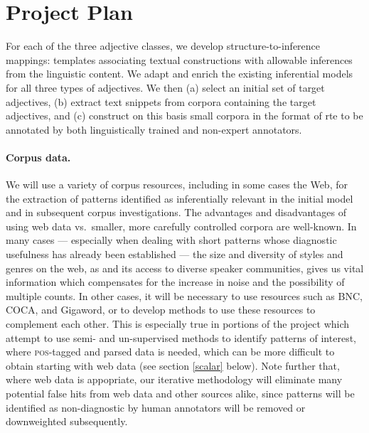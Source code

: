 \documentclass[10pt]{article}
\begin{document}
\vspace {-7mm}

\section{Project Plan}

\vspace {-3mm}


For each of the three adjective classes, we develop structure-to-inference mappings: templates associating textual constructions with allowable inferences from the linguistic content. We adapt and enrich the existing inferential models for all three types of adjectives. We then (a) select an initial set of target adjectives, (b) extract text snippets from corpora containing the target adjectives, and (c) construct on this basis small corpora in the format of {\sc rte} to be annotated by both linguistically trained and non-expert annotators. 

\vspace {-4mm}

\paragraph{Corpus data.}
We will use a variety of corpus resources, including in some cases the Web, for the extraction of patterns identified as inferentially relevant in the initial model and in subsequent corpus investigations. 
The advantages and disadvantages of using web data vs.\ smaller, more carefully controlled corpora are well-known.
In many cases --- especially when dealing with short patterns whose diagnostic usefulness has already been established --- the size and diversity of styles and genres on the web, as and its access to diverse speaker communities, gives us vital information which compensates for the increase in noise and the possibility of multiple counts.
In other cases, it will be necessary to use resources such as BNC, COCA, and Gigaword, or to develop methods to use these resources to complement each other.
This is especially true in portions of the project which attempt to use semi- and un-supervised methods to identify patterns of interest, where \textsc{pos}-tagged and parsed data is needed, which can be more difficult to obtain starting with web data (see section \ref{scalar} below).
Note further that, where web data is appopriate, our iterative methodology will eliminate many potential false hits from web data and other sources alike, since patterns will be identified as non-diagnostic by human annotators will be removed or downweighted subsequently.
\end{document}
